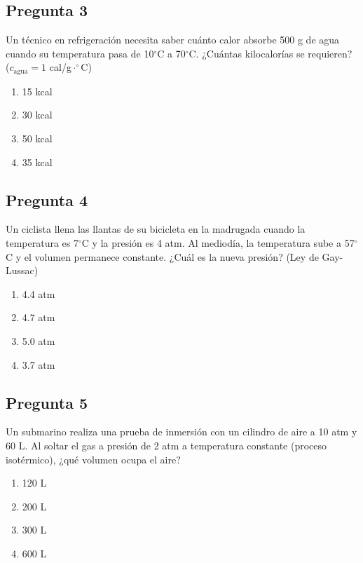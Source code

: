 \begin{preguntabox}
\subsection{Pregunta 3}
Un técnico en refrigeración necesita saber cuánto calor absorbe 500 g de agua cuando su temperatura pasa de 10$^\circ$C a 70$^\circ$C. ¿Cuántas kilocalorías se requieren? ($c_{\text{agua}} = 1$ cal/g$\cdot^\circ$C)

\begin{enumerate}
    \item[A)] 15 kcal
    \item[B)] 30 kcal
    \item[C)] 50 kcal
    \item[D)] 35 kcal
\end{enumerate}
\end{preguntabox}

\begin{preguntabox}
\subsection{Pregunta 4}
Un ciclista llena las llantas de su bicicleta en la madrugada cuando la temperatura es 7$^\circ$C y la presión es 4 atm. Al mediodía, la temperatura sube a 57$^\circ$C y el volumen permanece constante. ¿Cuál es la nueva presión? (Ley de Gay-Lussac)

\begin{enumerate}
    \item[A)] 4.4 atm
    \item[B)] 4.7 atm
    \item[C)] 5.0 atm
    \item[D)] 3.7 atm
\end{enumerate}
\end{preguntabox}

\begin{preguntabox}
\subsection{Pregunta 5}
Un submarino realiza una prueba de inmersión con un cilindro de aire a 10 atm y 60 L. Al soltar el gas a presión de 2 atm a temperatura constante (proceso isotérmico), ¿qué volumen ocupa el aire?

\begin{enumerate}
    \item[A)] 120 L
    \item[B)] 200 L
    \item[C)] 300 L
    \item[D)] 600 L
\end{enumerate}
\end{preguntabox}

